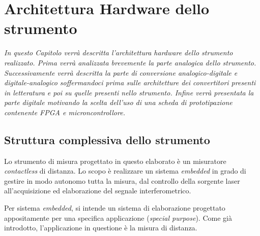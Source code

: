\chapter{Architettura Hardware dello strumento}
\label{capitolo3}
\thispagestyle{empty}

\textit{In questo Capitolo verrà descritta l'architettura hardware dello strumento realizzato. Prima verrà analizzata brevemente la parte analogica dello strumento. Successivamente verrà descritta la parte di conversione analogico-digitale e digitale-analogico soffermandoci prima sulle architetture dei convertitori presenti in letteratura e poi su quelle presenti nello strumento. Infine verrà presentata la parte digitale motivando la scelta dell'uso di una scheda di prototipazione contenente FPGA e microncontrollore.}

\section{Struttura complessiva dello strumento}
Lo strumento di misura progettato in questo elaborato è un misuratore \textit{contactless} di distanza. Lo scopo è realizzare un sistema \textit{embedded} in grado di gestire in modo autonomo tutta la misura, dal controllo della sorgente laser all'acquisizione ed elaborazione del segnale interferometrico.

Per sistema \textit{embedded}, si intende un sistema di elaborazione progettato appositamente per una specifica applicazione (\textit{special purpose}). Come già introdotto, l'applicazione in questione è la misura di distanza. 

